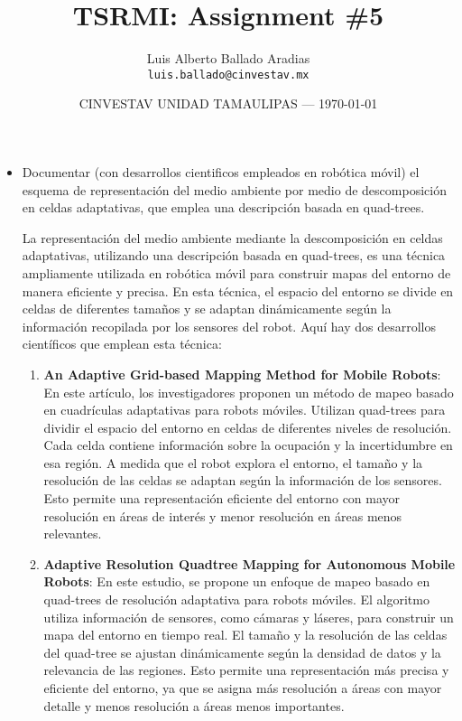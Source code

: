 \documentclass{article}
\title{TSRMI: Assignment \#5} %
\author{Luis Alberto Ballado Aradias\\ \texttt{luis.ballado@cinvestav.mx}} %
\date{CINVESTAV UNIDAD TAMAULIPAS --- \today} %
\begin{document}
\maketitle %


\begin{itemize} %
\item Documentar (con desarrollos cientificos empleados en robótica móvil) el esquema de representación del medio ambiente por medio de descomposición en celdas adaptativas, que emplea una descripción basada en quad-trees.

  La representación del medio ambiente mediante la descomposición en celdas adaptativas, utilizando una descripción basada en quad-trees, es una técnica ampliamente utilizada en robótica móvil para construir mapas del entorno de manera eficiente y precisa. En esta técnica, el espacio del entorno se divide en celdas de diferentes tamaños y se adaptan dinámicamente según la información recopilada por los sensores del robot. Aquí hay dos desarrollos científicos que emplean esta técnica:

  \begin{enumerate}
  \item \textbf{An Adaptive Grid-based Mapping Method for Mobile Robots}: En este artículo, los investigadores proponen un método de mapeo basado en cuadrículas adaptativas para robots móviles. Utilizan quad-trees para dividir el espacio del entorno en celdas de diferentes niveles de resolución. Cada celda contiene información sobre la ocupación y la incertidumbre en esa región. A medida que el robot explora el entorno, el tamaño y la resolución de las celdas se adaptan según la información de los sensores. Esto permite una representación eficiente del entorno con mayor resolución en áreas de interés y menor resolución en áreas menos relevantes.
  \item \textbf{Adaptive Resolution Quadtree Mapping for Autonomous Mobile Robots}: En este estudio, se propone un enfoque de mapeo basado en quad-trees de resolución adaptativa para robots móviles. El algoritmo utiliza información de sensores, como cámaras y láseres, para construir un mapa del entorno en tiempo real. El tamaño y la resolución de las celdas del quad-tree se ajustan dinámicamente según la densidad de datos y la relevancia de las regiones. Esto permite una representación más precisa y eficiente del entorno, ya que se asigna más resolución a áreas con mayor detalle y menos resolución a áreas menos importantes.
    

\end{enumerate}
\end{itemize}
\end{document}
